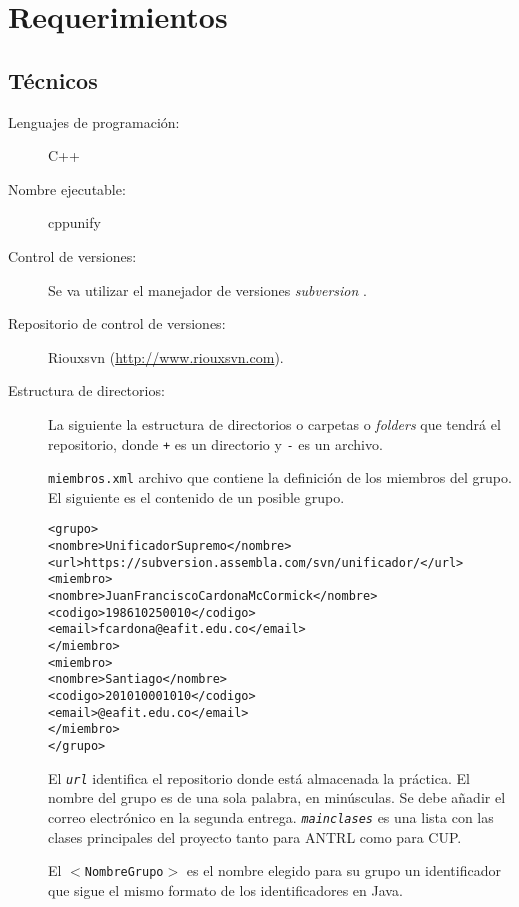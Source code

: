 \documentclass{article}
\theoremstyle{definition}
\begin{document}
\section{Requerimientos}
\label{sec:requerimientos}


\subsection{Técnicos}
\label{sec:reqtec}

\begin{description}
\item[Lenguajes de programación:] C++
\item[Nombre ejecutable:] cppunify
\item[Control de versiones:] Se va utilizar el manejador de versiones
  \emph{subversion}
  \parencite{collins-sussman--fitzpatrick-pilato-2011}.
\item[Repositorio de control de versiones:] Riouxsvn (\url{http://www.riouxsvn.com}).
\item[Estructura de directorios:] La siguiente la estructura de
  directorios o carpetas o \emph{folders} que tendrá el repositorio, donde
  \texttt{+} es un directorio y \texttt{-} es un archivo.
\begin{alltt}
\end{alltt}

  \texttt{miembros.xml} archivo que contiene la definición de los
  miembros del grupo. El siguiente es el contenido de un posible grupo.

  {\footnotesize
\begin{alltt}
<grupo>
   <nombre>UnificadorSupremo</nombre>
   <url>https://subversion.assembla.com/svn/unificador/</url>
   <miembro>
      <nombre>Juan Francisco Cardona McCormick</nombre>
      <codigo>198610250010</codigo>
      <email>fcardona@eafit.edu.co</email>
   </miembro>
   <miembro>
      <nombre>Santiago </nombre>
      <codigo>201010001010</codigo>
      <email>@eafit.edu.co</email>
   </miembro>
</grupo>
\end{alltt}
  }

  El \emph{\texttt{url}} identifica el repositorio donde está
  almacenada la práctica.  El nombre del grupo es de una sola palabra,
  en minúsculas. Se debe añadir el correo electrónico en la segunda
  entrega. \emph{\texttt{mainclases}} es una lista con las clases
  principales del proyecto tanto para ANTRL como para CUP.

  El \texttt{$<$NombreGrupo$>$} es el nombre elegido para su grupo un identificador que
  sigue el mismo formato de los identificadores en Java.


\end{description}
\end{document}
